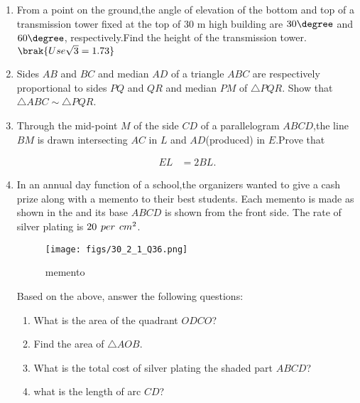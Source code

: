 \begin{enumerate}
\item  From a point on the ground,the angle of elevation of the bottom and top of a transmission tower fixed at the top of $30$ m high building are $30\degree$ and $60\degree$, respectively.Find the height of the transmission tower.$\brak{Use \sqrt{3} = 1.73}$
    
\item Sides $AB$ and $BC$ and median $AD$ of a triangle $ABC$ are respectively proportional to sides $PQ$ and $QR$ and median $PM$ of $\triangle PQR$. Show that $\triangle ABC \sim \triangle PQR$. 

\item  Through the mid-point $M$ of the side $CD$ of a parallelogram $ABCD$,the line $BM$ is drawn intersecting $AC$ in $L$ and $AD$(produced) in $E$.Prove that

    \begin{align}
    EL &= 2BL.
    \end{align}

\item  In an annual day function of a school,the organizers wanted to give a cash prize along with a memento to their best students. Each memento is made as shown in  the  and its base $ABCD$ is shown from the front side. The rate of silver plating is \rupee \hspace{4 pt}$20 \hspace{4 pt} per \hspace{4 pt}  cm^2$.

\begin{figure}[!ht]
    \centering
    \texttt{[image: figs/30\_2\_1\_Q36.png]}
    \caption{memento}
    \label{fig:30_2_1_Q36}
\end{figure}

Based on the above, answer the following questions:
\begin{enumerate}[label=(\roman*)]
    \item What is the area of the quadrant $ODCO$?
    \item Find the area of $\triangle  AOB$.
    \item What is the total cost of silver plating the shaded part $ABCD$?
    \item what is the length of arc $CD$?
\end{enumerate}
\end{enumerate}
%











